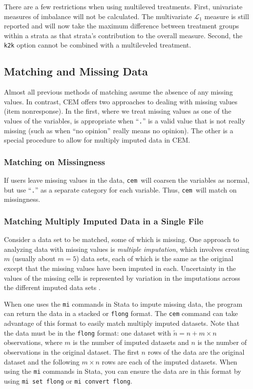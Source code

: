 \documentclass[11pt]{article}
\newcommand{\cem}{\texttt{cem }}
\begin{document}
There are a few restrictions when using multileved treatments. First, univariate measures of imbalance will not be calculated. The multivariate $\mathcal{L}_1$ measure is still reported and will now take the maximum difference between treatment groups within a strata as that strata's contribution to the overall measure.  Second, the \texttt{k2k} option cannot be combined with a multileveled treatment. 

\subsection{Matching and Missing Data}\label{s:mv}

Almost all previous methods of matching assume the absence of any missing
values.  In contrast, CEM offers two approaches to dealing with
missing values (item nonresponse).  In the first, where we treat missing
values as one of the values of the variables, is appropriate when
``\texttt{.}'' is a valid value that is not really missing (such as when
``no opinion'' really means no opinion).  The other is a special procedure
to allow for multiply imputed data in CEM.


\subsubsection{Matching on Missingness}\label{s:mvdirect}

If users leave missing values in the data, \cem will coarsen the variables
as normal, but use ``\texttt{.}'' as a separate category for each
variable. Thus, \cem will match on missingness. 

\subsubsection{Matching Multiply Imputed Data in a Single File}\label{s:mvmiflong}

Consider a data set to be matched, some of which is missing. One
approach to analyzing data with missing values is \emph{multiple
imputation}, which involves creating $m$ (usually about $m=5$) data
sets, each of which is the same as the original except that the
missing values have been imputed in each.  Uncertainty in the values
of the missing cells is represented by variation in the imputations
across the different imputed data sets \citep{KinHonJos01}.

When one uses the \texttt{mi} commands in Stata to impute missing
data, the program can return the data in a stacked or \texttt{flong}
format. The \texttt{cem} command can take advantage of this format to
easily match multiply imputed datasets. Note that the data must be in
the \texttt{flong} format: one dataset with $\tilde{n} = n + m \times
n$ observations, where $m$ is the number of imputed datasets and $n$
is the number of observations in the original dataset. The first $n$
rows of the data are the original dataset and the following $m \times
n$ rows are each of the imputed datasets. When using the \texttt{mi}
commands in Stata, you can ensure the data are in this format by using
\texttt{mi set flong} or \texttt{mi convert flong}.
\end{document}
